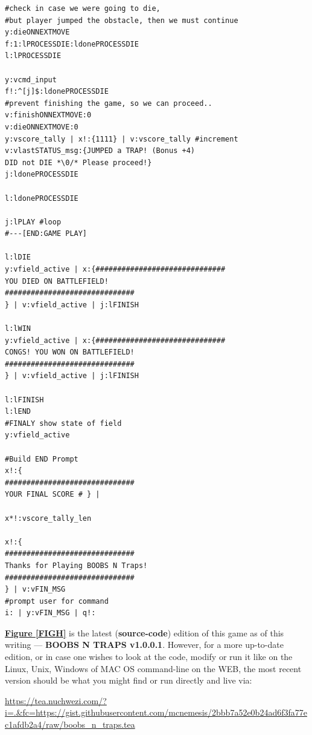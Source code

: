 \documentclass[a4paper, 18pt]{book} %
\begin{document}
{\begin{tcolorbox}[teaterminalstyle, title=TEA Program: BOOBS N TRAPS v1.0.0.1, breakable]
\begin{lstlisting}[language=TEA,breaklines=true]
#check in case we were going to die, 
#but player jumped the obstacle, then we must continue
y:dieONNEXTMOVE
f:1:lPROCESSDIE:ldonePROCESSDIE
l:lPROCESSDIE

y:vcmd_input
f!:^[j]$:ldonePROCESSDIE
#prevent finishing the game, so we can proceed..
v:finishONNEXTMOVE:0
v:dieONNEXTMOVE:0
y:vscore_tally | x!:{1111} | v:vscore_tally #increment
v:vlastSTATUS_msg:{JUMPED a TRAP! (Bonus +4)
DID not DIE *\0/* Please proceed!}
j:ldonePROCESSDIE

l:ldonePROCESSDIE

j:lPLAY #loop
#---[END:GAME PLAY]

l:lDIE
y:vfield_active | x:{##############################
YOU DIED ON BATTLEFIELD!
##############################
} | v:vfield_active | j:lFINISH

l:lWIN
y:vfield_active | x:{##############################
CONGS! YOU WON ON BATTLEFIELD!
##############################
} | v:vfield_active | j:lFINISH

l:lFINISH
l:lEND
#FINALY show state of field
y:vfield_active

#Build END Prompt
x!:{
##############################
YOUR FINAL SCORE # } |

x*!:vscore_tally_len

x!:{
##############################
Thanks for Playing BOOBS N Traps!
##############################
} | v:vFIN_MSG
#prompt user for command
i: | y:vFIN_MSG | q!:
   \end{lstlisting}
  \end{tcolorbox}
  \label{FIGH}
  \vspace{1cm}


}
 \raggedright %
  
 
 \textbf{\hyperref[FIGH]{Figure \ref{FIGH}}} is the latest (\textbf{source-code}) edition of this game as of this writing --- \textbf{BOOBS N TRAPS v1.0.0.1}. However, for a more up-to-date edition, or in case one wishes to look at the code, modify or run it like on the Linux, Unix, Windows of MAC OS command-line on the WEB, the most recent version should be what you might find or run directly and live via:
  
  
\vspace{1em}

 \url{https://tea.nuchwezi.com/?i=.&fc=https://gist.githubusercontent.com/mcnemesis/2bbb7a52e0b24ad6f3fa77ec1afdb2a4/raw/boobs_n_traps.tea}
\end{document}
